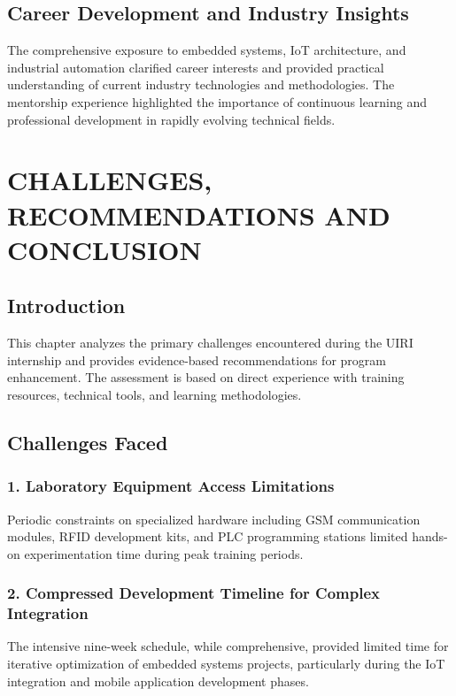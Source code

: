 \documentclass[12pt,a4paper]{report}
\begin{document}
\section{Career Development and Industry Insights}

The comprehensive exposure to embedded systems, IoT architecture, and industrial automation clarified career interests and provided practical understanding of current industry technologies and methodologies. The mentorship experience highlighted the importance of continuous learning and professional development in rapidly evolving technical fields.

\chapter{CHALLENGES, RECOMMENDATIONS AND CONCLUSION}

\section{Introduction}

This chapter analyzes the primary challenges encountered during the UIRI internship and provides evidence-based recommendations for program enhancement. The assessment is based on direct experience with training resources, technical tools, and learning methodologies.

\section{Challenges Faced}

\subsection*{1. Laboratory Equipment Access Limitations}
Periodic constraints on specialized hardware including GSM communication modules, RFID development kits, and PLC programming stations limited hands-on experimentation time during peak training periods.

\subsection*{2. Compressed Development Timeline for Complex Integration}
The intensive nine-week schedule, while comprehensive, provided limited time for iterative optimization of embedded systems projects, particularly during the IoT integration and mobile application development phases.
\end{document}
